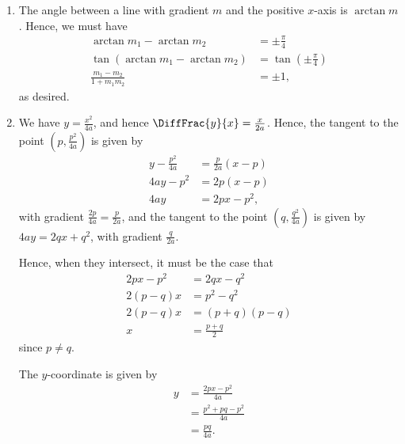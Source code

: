 \Question{\currfilebase}

\begin{enumerate}
    \item The angle between a line with gradient \(m\) and the positive \(x\)-axis is \(\arctan m\). Hence, we must have
          \begin{align*}
              \arctan m_1 - \arctan m_2                   & = \pm \frac{\pi}{4}                   \\
              \tan \left(\arctan m_1 - \arctan m_2\right) & = \tan \left(\pm \frac{\pi}{4}\right) \\
              \frac{m_1 - m_2}{1 + m_1 m_2}               & = \pm 1,
          \end{align*}
          as desired.

    \item We have \(y = \frac{x^2}{4a}\), and hence \(\DiffFrac{y}{x} = \frac{x}{2a}\). Hence, the tangent to the point \(\left(p, \frac{p^2}{4a}\right)\) is given by
          \begin{align*}
              y - \frac{p^2}{4a} & = \frac{p}{2a} \left(x - p\right) \\
              4ay - p^2          & = 2p (x - p)                      \\
              4ay                & = 2px - p^2,
          \end{align*}
          with gradient \(\frac{2p}{4a} = \frac{p}{2a}\), and the tangent to the point \(\left(q, \frac{q^2}{4a}\right)\) is given by \(4ay = 2qx + q^2\), with gradient \(\frac{q}{2a}\).

          Hence, when they intersect, it must be the case that
          \begin{align*}
              2px - p^2   & = 2qx - q^2       \\
              2 (p - q) x & = p^2 - q^2       \\
              2 (p - q) x & = (p + q) (p - q) \\
              x           & = \frac{p + q}{2}
          \end{align*}
          since \(p \neq q\).

          The \(y\)-coordinate is given by
          \begin{align*}
              y & = \frac{2px - p^2}{4a}      \\
                & = \frac{p^2 + pq - p^2}{4a} \\
                & = \frac{pq}{4a}.
          \end{align*}


\end{enumerate}
